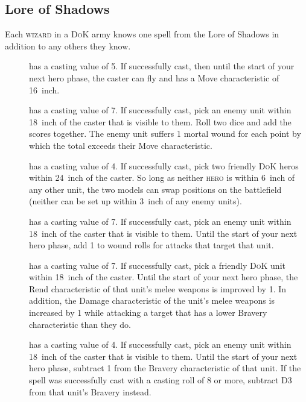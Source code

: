 \hypertarget{lore-of-shadows}{%
    \subsection{Lore of Shadows}\label{lore-of-shadows}}
Each \textsc{wizard} in a \textsc{DoK} army knows one spell from the Lore
of Shadows in addition to any others they know.\\
\begin{description}
\item [] has a casting value of
  5. If successfully cast, then until the start of your next hero phase,
  the caster can fly and has a Move characteristic of 16~inch.
\item [] has a casting value of
  7. If successfully cast, pick an enemy unit within 18~inch of the caster
  that is visible to them. Roll two dice and add the scores together.
  The enemy unit suffers 1 mortal wound for each point by which the
  total exceeds their Move characteristic.
\item [] has a casting value of 4.
  If successfully cast, pick two friendly \textsc{DoK} heros
  within 24~inch of the caster. So long as neither \textsc{hero} is within 6~inch of any
  other unit, the two models can swap positions on the battlefield
  (neither can be set up within 3~inch of any enemy units).
\item [] has a casting value of
  7. If successfully cast, pick an enemy unit within 18~inch of the caster
  that is visible to them. Until the start of your next hero phase, add
  1 to wound rolls for attacks that target that unit.
\item [] has a casting value of 7. If
  successfully cast, pick a friendly \textsc{DoK} unit within 18~inch
  of the caster. Until the start of your next hero phase, the Rend
  characteristic of that unit's melee weapons is improved by 1. In
  addition, the Damage characteristic of the unit's melee weapons is
  increased by 1 while attacking a target that has a lower Bravery
  characteristic than they do.
\item [] has a casting
  value of 4. If successfully cast, pick an enemy unit within 18~inch of the
  caster that is visible to them. Until the start of your next hero
  phase, subtract 1 from the Bravery characteristic of that unit. If the
  spell was successfully cast with a casting roll of 8 or more, subtract
  D3 from that unit's Bravery instead.
\end{description}

